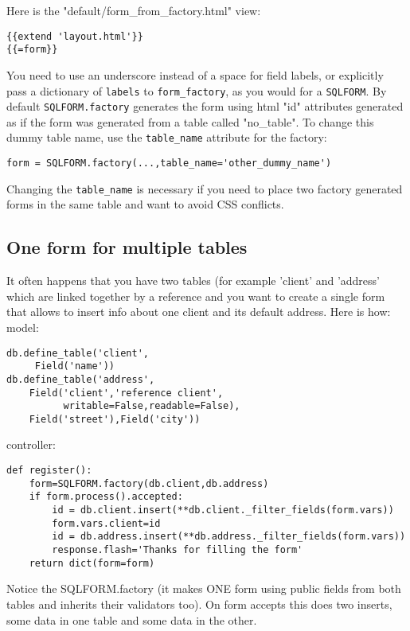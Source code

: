 \documentclass[justified,sixbynine,notoc]{tufte-book}
\def\ft{\small\tt}
\begin{document}
\begin{fullwidth}
Here is the "default/form\_from\_factory.html" view:
\begin{lstlisting}[keywords={}]
{{extend 'layout.html'}}
{{=form}}
\end{lstlisting}

You need to use an underscore instead of a space for field labels, or explicitly pass a dictionary of {\ft labels} to {\ft form\_factory}, as you would for a {\ft SQLFORM}. By default {\ft SQLFORM.factory} generates the form using html "id" attributes generated as if the form was generated from a table called "no\_table". To change this dummy table name, use the {\ft table\_name} attribute for the factory:
\begin{lstlisting}
form = SQLFORM.factory(...,table_name='other_dummy_name')
\end{lstlisting}

Changing the {\ft table\_name} is necessary if you need to place two factory generated forms in the same table and want to avoid CSS conflicts.

\goodbreak\subsection{One form for multiple tables}

It often happens that you have two tables (for example 'client' and
'address' which are linked together by a reference and you want to
create a single form that allows to insert info about one client and
its default address. Here is how:
\noindent model:
\begin{lstlisting}
db.define_table('client',
     Field('name'))
db.define_table('address',
    Field('client','reference client',
          writable=False,readable=False),
    Field('street'),Field('city'))
\end{lstlisting}
\noindent controller:
\begin{lstlisting}
def register():
    form=SQLFORM.factory(db.client,db.address)
    if form.process().accepted:
        id = db.client.insert(**db.client._filter_fields(form.vars))
        form.vars.client=id
        id = db.address.insert(**db.address._filter_fields(form.vars))
        response.flash='Thanks for filling the form'
    return dict(form=form)
\end{lstlisting}

Notice the SQLFORM.factory (it makes ONE form using public fields from
both tables and inherits their validators too).
On form accepts this does two inserts, some data in one table and some
data in the other.


\end{fullwidth}
\end{document}
